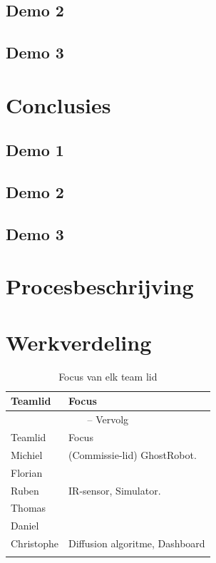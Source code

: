 \documentclass[12pt,a4paper]{report}
\begin{document}
\section{Demo 2}
\section{Demo 3}

\chapter{Conclusies}
\section{Demo 1}
\section{Demo 2}
\section{Demo 3}
\chapter{Procesbeschrijving}

\chapter{Werkverdeling}

\begin{longtable}{l l}
\caption{Focus van elk team lid} \\ [0.5ex]
\hline\hline
Teamlid & Focus \\ [0.5ex]
\hline 
\endfirsthead
\multicolumn{2}{c}{{\tablename} \thetable{} -- Vervolg} \\[0.5ex]
\hline \hline
Teamlid & Focus \\ [0.5ex]
\hline 
\endhead
Michiel 		& 	(Commissie-lid) GhostRobot. \\
Florian 		&	\\
Ruben 		&	IR-sensor, Simulator.\\
Thomas 		&	\\
Daniel 		&	\\
Christophe 	&	Diffusion algoritme, Dashboard \\
\hline
\label{tab:focus}
\end{longtable}
\end{document}
